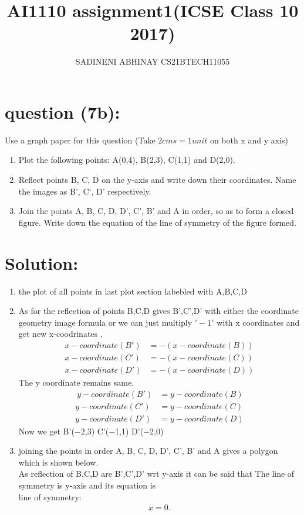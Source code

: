 \documentclass[11pt, letterpaper]{article}
\title{AI1110 assignment1(ICSE Class 10 2017)}
\author{SADINENI ABHINAY CS21BTECH11055}
\begin{document}
 \maketitle
\section{question (7b):}
Use a graph paper for this question (Take $2 cms = 1 unit$ on both x and y axis)\\
\begin{enumerate}[ label=(\roman*)]
\item Plot the following points: A(0,4), B(2,3), C(1,1) and D(2,0).
\item Reflect points B, C, D on the y-axis and write down their coordinates. Name
     the images as B', C', D' respectively.
\item Join the points A, B, C, D, D', C', B' and A in order, so as to form a closed
      figure. Write down the equation of the line of symmetry of the figure formed.
\end{enumerate}      

\section{Solution:}
\begin{enumerate}[label=(\roman*)]
\item the plot of all points in last plot section labebled with  A,B,C,D\\
\item As for the reflection of points B,C,D
 gives B',C',D' with either the coordinate geometry image formula or we can just  multiply $'-1'$ with x coordinates and get new x-coodrinates .\\
 \begin{align}
      x-coordinate(B') &=-(x-coordinate(B))\\
      x-coordinate(C')& =-(x-coordinate(C))\\
      x-coordinate(D')& =-(x-coordinate(D))
      \end{align}
   The y coordinate remains same.\\
  \begin{align}\
                y-coordinate(B')&= y-coordinate(B)\\
                y-coordinate(C')&= y-coordinate(C)\\
                y-coordinate(D')&= y-coordinate(D)
                 \end{align}
  Now we get 
    B'($-$2,3)    C'($-$1,1)    D'($-$2,0) 
 \item joining the points in order  A, B, C, D, D', C', B' and A gives a polygon which is shown below.\\
    As reflection of B,C,D are B',C',D' wrt y-axis it can be said that
    The line of symmetry is y-axis and its equation is \\
      line of symmetry:
    \begin{align}
    	\label{line of symmetry equation}
    	x=0.
    \end{align}

\end{enumerate}      
\end{document}
